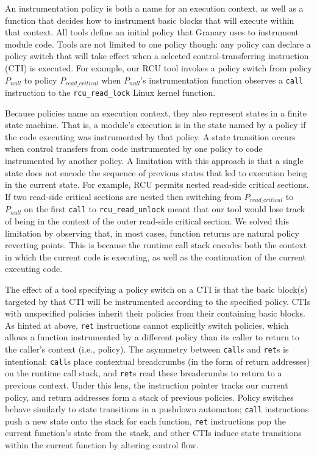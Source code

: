 \documentclass[preprint]{sigplanconf}
\begin{document}
An instrumentation policy is both a name for an execution context, as well as a function that decides how to instrument basic blocks that will execute within that context. All tools define an initial policy that Granary uses to instrument module code. Tools are not limited to one policy though: any policy can declare a policy switch that will take effect when a selected control-transferring instruction (CTI) is executed. For example, our RCU tool invokes a policy switch from policy $P_{\mathit{null}}$ to policy $P_{\mathit{read\_critical}}$ when $P_{\mathit{null}}$'s instrumentation function observes a \texttt{call} instruction to the \texttt{rcu\_read\_lock} Linux kernel function.

Because policies name an execution context, they also represent states in a finite state machine. That is, a module's execution is in the state named by a policy if the code executing was instrumented by that policy. A state transition occurs when control transfers from code instrumented by one policy to code instrumented by another policy. A limitation with this approach is that a single state does not encode the sequence of previous states that led to execution being in the current state. For example, RCU permits nested read-side critical sections. If two read-side critical sections are nested then switching from $P_{\mathit{read\_critical}}$ to $P_{\mathit{null}}$ on the first \texttt{call} to \texttt{rcu\_read\_unlock} meant that our tool would lose track of being in the context of the outer read-side critical section. We solved this limitation by observing that, in most cases, function returns are natural policy reverting points. This is because the runtime call stack encodes both the context in which the current code is executing, as well as the continuation of the current executing code.

The effect of a tool specifying a policy switch on a CTI is that the basic block(s) targeted by that CTI will be instrumented according to the specified policy. CTIs with unspecified policies inherit their policies from their containing basic blocks. As hinted at above, \texttt{ret} instructions cannot explicitly switch policies, which allows a function instrumented by a different policy than its caller to return to the caller's context (i.e., policy). The asymmetry between \texttt{call}s and \texttt{ret}s is intentional: \texttt{call}s place contextual breadcrumbs (in the form of return addresses) on the runtime call stack, and \texttt{ret}s read these breadcrumbs to return to a previous context. Under this lens, the instruction pointer tracks our current policy, and return addresses form a stack of previous policies. Policy switches behave similarly to state transitions in a pushdown automaton; \texttt{call} instructions push a new state onto the stack for each function, \texttt{ret} instructions pop the current function's state from the stack, and other CTIs induce state transitions within the current function by altering control flow.
\end{document}
